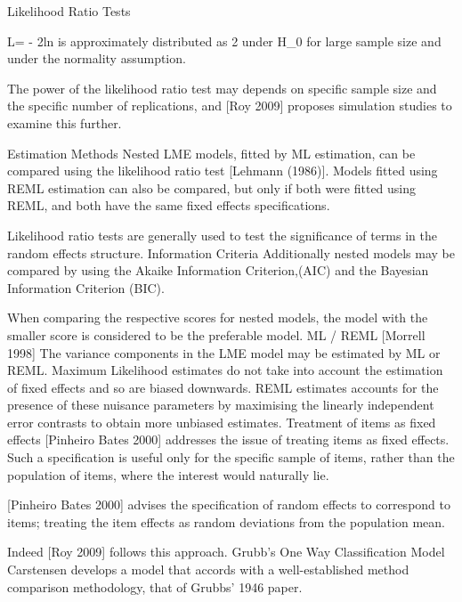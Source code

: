 
Likelihood Ratio Tests

L= - 2ln is approximately distributed as 2 under H_0 for large sample size and under the normality assumption.

The power of the likelihood ratio test may depends on specific sample size and the specific number of replications, and [Roy 2009] proposes simulation studies to examine this further.

Estimation Methods
Nested LME models, fitted by ML estimation, can be compared using the likelihood ratio test [Lehmann (1986)].
Models fitted using REML estimation can also be compared, but only if both were fitted using REML, and both have the same fixed effects specifications.

Likelihood ratio tests are generally used to test the significance of terms in the random effects structure.
Information Criteria
Additionally nested models may be compared by using the Akaike Information Criterion,(AIC) and the Bayesian Information Criterion (BIC).

When comparing the respective scores for nested models, the model with the smaller score is considered to be the preferable model.
ML / REML
[Morrell 1998]
The variance components in the LME model may be estimated by ML or REML.
Maximum Likelihood estimates do not take into account the estimation of fixed effects and so
are biased downwards.
REML estimates accounts for the presence of these nuisance parameters by maximising the linearly independent error contrasts to obtain more unbiased estimates.
Treatment of items as fixed effects
[Pinheiro Bates 2000] addresses the issue of treating items as fixed effects. Such a specification is useful only for the specific sample of items, rather than the population of items, where the interest would naturally lie.

[Pinheiro Bates 2000] advises the specification of random effects to correspond to items; treating the item effects as random deviations from the population mean.

Indeed [Roy 2009] follows this approach.
Grubb’s One Way Classification Model 
Carstensen develops a model that accords with a well-established method comparison methodology, that of Grubbs’ 1946 paper.



